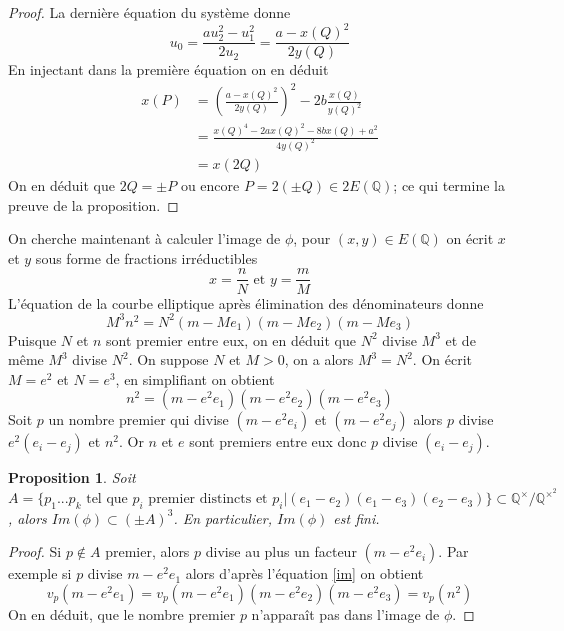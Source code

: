 \documentclass{article}
\newtheorem{proposition}{Proposition}
\begin{document}
\begin{proof}
La dernière équation du système donne
\begin{equation*}
u_{0} = \frac{au_{2}^2 - u_{1}^2}{2u_{2}} = \frac{a - x(Q)^2}{2y(Q)}
\end{equation*}
En injectant dans la première équation on en déduit
\begin{align*}
x(P)	&= {(\frac{a - x(Q)^2}{2y(Q)})}^2 - 2b\frac{x(Q)}{y(Q)^2} \\
		&= \frac{x(Q)^4 - 2ax(Q)^2 - 8bx(Q) + a^2}{4y(Q)^2} \\
		&= x(2Q)
\end{align*}
On en déduit que $2Q = \pm P$ ou encore $P = 2(\pm Q) \in 2E(\mathbb{Q})$; ce qui termine la preuve de la proposition.
\end{proof}

On cherche maintenant à calculer l'image de $\phi$, pour $(x, y) \in E(\mathbb{Q})$ on écrit $x$ et $y$ sous forme
de fractions irréductibles
\begin{equation*}
x=\frac{n}{N} \text{ et } y=\frac{m}{M}
\end{equation*}
L'équation de la courbe elliptique après élimination des dénominateurs donne
\begin{equation*}
M^3n^2 = N^2(m-Me_{1})(m-Me_{2})(m-Me_{3})
\end{equation*}
Puisque $N$ et $n$ sont premier entre eux, on en déduit que $N^2$ divise $M^3$ et de même $M^3$ divise $N^2$.
On suppose $N$ et $M > 0$, on a alors $M^3 = N^2$. On écrit $M=e^2$ et $N=e^3$, en simplifiant on obtient
\begin{equation}
\label{im}
n^2 = (m-e^2e_{1})(m-e^2e_{2})(m-e^2e_{3})
\end{equation}
Soit $p$ un nombre premier qui divise $(m-e^2e_{i})$ et $(m-e^2e_{j})$ alors $p$ divise $e^2(e_{i}-e_{j})$ et $n^2$.
Or $n$ et $e$ sont premiers entre eux donc $p$ divise $(e_{i}-e_{j})$.
\begin{proposition}
Soit $A=\{p_{1}...p_{k} \text{ tel que $p_{i}$ premier distincts et } p_{i} | (e_{1}-e_{2})(e_{1}-e_{3})(e_{2}-e_{3})\} 
\subset \mathbb{Q}^{\times}/\mathbb{Q}^{\times^2}$, alors $Im(\phi) \subset (\pm A)^3$. En particulier,
$Im(\phi)$ est fini.
\end{proposition}

\begin{proof}
Si $p \not\in A$ premier, alors $p$ divise au plus un facteur $(m-e^2e_{i})$. Par exemple si $p$ divise $m-e^2e_{1}$
alors d'après l'équation \ref{im} on obtient
\begin{equation*}
v_{p}(m-e^2e_{1})=v_{p}(m-e^2e_{1})(m-e^2e_{2})(m-e^2e_{3})=v_{p}(n^2)
\end{equation*}
On en déduit, que le nombre premier $p$ n'apparaît pas dans l'image de $\phi$.
\end{proof}
\end{document}
